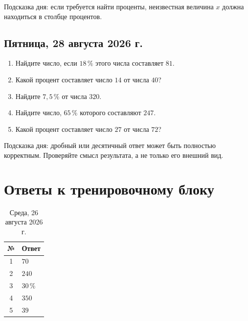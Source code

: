 \documentclass[a4paper,12pt]{article}
\newcommand{\pct}[1]{#1\,\%}
\begin{document}
\vspace{0.7cm}

\textcolor{softgray}{
Подсказка дня: если требуется найти проценты,
неизвестная величина \(x\) должна находиться в столбце процентов.
}


\subsection*{\textcolor{darkaccent}{Пятница, 28 августа 2026 г.}}

\begin{enumerate}
    \item Найдите число, если \(\pct{18}\) этого числа составляет \(81\).

    \item Какой процент составляет число \(14\) от числа \(40\)?

    \item Найдите \(\pct{7,5}\) от числа \(320\).

    \item Найдите число, \(\pct{65}\) которого составляют \(247\).

    \item Какой процент составляет число \(27\) от числа \(72\)?
\end{enumerate}

\vspace{0.7cm}

\textcolor{softgray}{
Подсказка дня: дробный или десятичный ответ может быть полностью корректным.
Проверяйте смысл результата, а не только его внешний вид.
}


\newpage

\section*{\textcolor{darkaccent}{Ответы к тренировочному блоку}}

\renewcommand{\arraystretch}{1.45}

\begin{table}[h]
\centering
\caption{Среда, 26 августа 2026 г.}
\begin{tabularx}{0.82\linewidth}{c X}
\toprule
\textbf{№} & \textbf{Ответ} \\
\midrule
1 & \(70\) \\
2 & \(240\) \\
3 & \(\pct{30}\) \\
4 & \(350\) \\
5 & \(39\) \\
\bottomrule
\end{tabularx}
\end{table}
\end{document}

